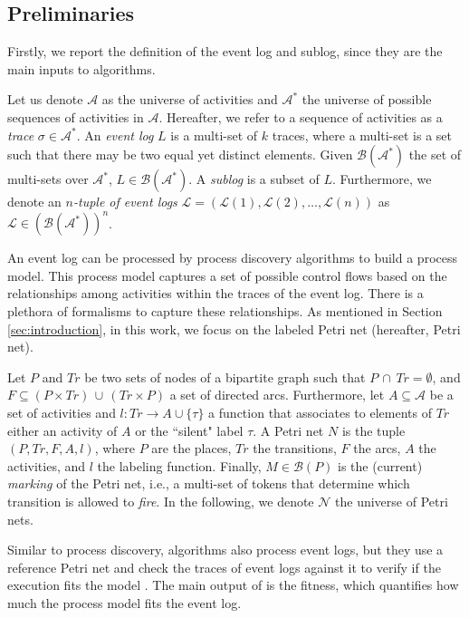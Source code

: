 \subsection{Preliminaries}
Firstly, we report the definition of the event log and sublog, since they are the main inputs to  algorithms.
\begin{definition}
\label{def:el}
Let us denote $\mathcal{A}$ as the universe of activities and $\mathcal{A}^*$ the universe of possible sequences of activities in $\mathcal{A}$. Hereafter, we refer to a sequence of activities as a \emph{trace} $\sigma\in\mathcal{A}^*$. An \emph{event log} $L$ is a multi-set of $k$ traces, where a multi-set is a set such that there may be two equal yet distinct elements. Given $\mathcal{B}(\mathcal{A}^*)$ the set of multi-sets over $\mathcal{A}^*$, $L\in\mathcal{B}(\mathcal{A}^*)$. A \emph{sublog} is a subset of $L$. Furthermore, we denote an \emph{$n$-tuple of event logs} $\mathcal{L}=(\mathcal{L}(1),\mathcal{L}(2),\dots, \mathcal{L}(n))$ as $\mathcal{L}\in(\mathcal{B}(\mathcal{A^*}))^n$. 
\end{definition}
An event log can be processed by process discovery algorithms to build a process model. This process model captures a set of possible control flows based on the relationships among activities within the traces of the event log. There is a plethora of formalisms to capture these relationships. As mentioned in Section \ref{sec:introduction}, in this work, we focus on the labeled Petri net (hereafter, Petri net).
\begin{definition}
Let $P$ and $Tr$ be two sets of nodes of a bipartite graph such that $P\,\cap\,Tr=\emptyset$, and $F\subseteq (P\times Tr)\,\cup\,(Tr\times P)$ a set of directed arcs. Furthermore, let $A\subseteq\mathcal{A}$ be a set of activities and $l:Tr\rightarrow A\cup\{\tau\}$ a function that associates to elements of $Tr$ either an activity of $A$ or the ``silent" label $\tau$. A Petri net $N$ is the tuple $(P,Tr,F,A,l)$, where $P$ are the places, $Tr$ the transitions, $F$ the arcs, $A$ the activities, and $l$ the labeling function. Finally, $M\in \mathcal{B}(P)$ is the (current) \emph{marking} of the Petri net, i.e., a multi-set of tokens that determine which transition is allowed to \emph{fire}. In the following, we denote $\mathcal{N}$ the universe of Petri nets. 
\end{definition}
Similar to process discovery,  algorithms also process event logs, but they use a reference Petri net and check the traces of event logs against it to verify if the execution fits the model \cite{aalst2022pmhandbook}. The main output of  is the fitness, which quantifies how much the process model fits the event log.

